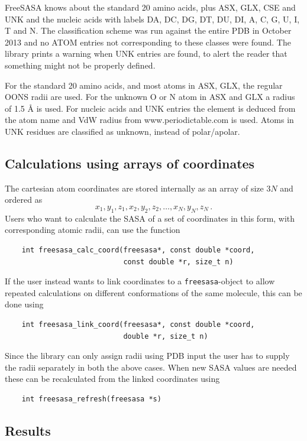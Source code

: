 \documentclass[a4paper,11pt]{article}
\begin{document}
FreeSASA knows about the standard 20 amino acids, plus ASX, GLX, CSE
and UNK and the nucleic acids with labels DA, DC, DG, DT, DU, DI, A,
C, G, U, I, T and N. The classification scheme was run against the
entire PDB in October 2013 and no ATOM entries not corresponding to
these classes were found. The library prints a warning when UNK
entries are found, to alert the reader that something might not be
properly defined.

For the standard 20 amino acids, and most atoms in ASX, GLX, the
regular OONS radii \cite{OONS} are used. For the unknown O or N atom
in ASX and GLX a radius of 1.5 Å is used. For nucleic acids and UNK
entries the element is deduced from the atom name and VdW radius from
www.periodictable.com is used. Atoms in UNK residues are classified as
unknown, instead of polar/apolar.

\subsection{Calculations using arrays of coordinates}

The cartesian atom coordinates are stored internally as an array of
size $3N$ and ordered as $$x_1,y_1,z_1, x_2,y_2,z_2, \ldots
,x_N,y_N,z_N\,.$$ Users who want to calculate the SASA of a set of
coordinates in this form, with corresponding atomic radii, can use the
function
\begin{verbatim}
    int freesasa_calc_coord(freesasa*, const double *coord, 
                            const double *r, size_t n)
\end{verbatim}
If the user instead wants to link coordinates to a
\verb|freesasa|-object to allow repeated calculations on different
conformations of the same molecule, this can be done using
\begin{verbatim}
    int freesasa_link_coord(freesasa*, const double *coord,
                            double *r, size_t n)
\end{verbatim}

Since the library can only assign radii using PDB input the user has
to supply the radii separately in both the above cases. When new SASA
values are needed these can be recalculated from the linked
coordinates using
\begin{verbatim} 
    int freesasa_refresh(freesasa *s)
\end{verbatim}

\subsection{Results}
\end{document}
